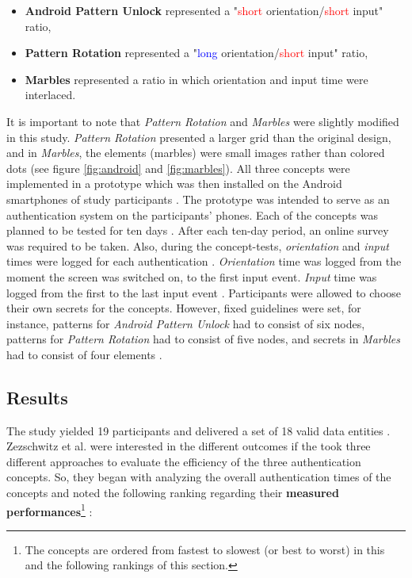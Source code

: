 \begin{itemize}
    \item \textbf{Android Pattern Unlock} represented a "\textcolor{red}{short} orientation/\textcolor{red}{short} input" ratio,
    \item \textbf{Pattern Rotation} represented a "\textcolor{blue}{long} orientation/\textcolor{red}{short} input" ratio,
    \item \textbf{Marbles} represented a ratio in which orientation and input time were interlaced.
\end{itemize}

It is important to note that \textit{Pattern Rotation} and \textit{Marbles} \cite{Marbles} were slightly modified in this study. \textit{Pattern Rotation} presented a larger grid than the original design, and in \textit{Marbles}, the elements (marbles) were small images rather than colored dots (see figure \ref{fig:android} and \ref{fig:marbles}). All three concepts were implemented in a prototype which was then installed on the Android smartphones of study participants \cite{Zezschwitz}. The prototype was intended to serve as an authentication system on the participants' phones. Each of the concepts was planned to be tested for ten days \cite{Zezschwitz}. After each ten-day period, an online survey was required to be taken. Also, during the concept-tests, \textit{orientation} and \textit{input} times were logged for each authentication \cite{Zezschwitz}. \textit{Orientation} time was logged from the moment the screen was switched on, to the first input event. \textit{Input} time was logged from the first to the last input event \cite{Zezschwitz}. Participants were allowed to choose their own secrets for the concepts. However, fixed guidelines were set, for instance, patterns for \textit{Android Pattern Unlock} had to consist of six nodes, patterns for \textit{Pattern Rotation} had to consist of five nodes, and secrets in \textit{Marbles} had to consist of four elements \cite{Zezschwitz}.

\subsection{Results}

The study yielded 19 participants and delivered a set of 18 valid data entities \cite{Zezschwitz}. Zezschwitz et al. \cite{Zezschwitz} were interested in the different outcomes if the took three different approaches to evaluate the efficiency of the three authentication concepts. So, they began with analyzing the overall authentication times of the concepts and noted the following ranking regarding their \textbf{measured performances}\footnote{The concepts are ordered from fastest to slowest (or best to worst) in this and the following rankings of this section.} \cite{Zezschwitz}:

